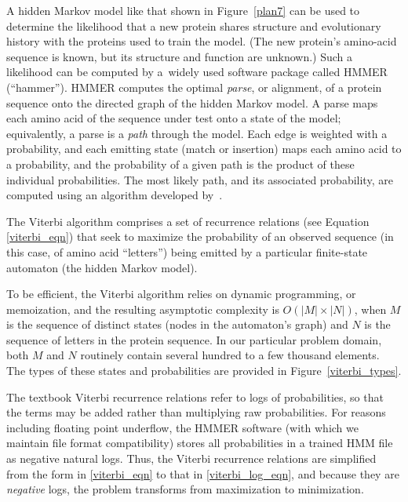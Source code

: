 \documentclass[preprint,nonatbib,blockstyle,nocopyrightspace,times]{sigplanconf}
\newcommand\figref[1]{Figure~\ref{#1}}
\begin{document}
A hidden Markov model like that shown in \figref{plan7} can be used to
determine the likelihood that a new protein shares structure and
evolutionary history with the proteins used to train the model.
(The new protein's amino-acid sequence is known, but its structure and
function are unknown.)
Such a likelihood can be computed by
a~widely used software package called HMMER (``hammer'').
HMMER computes the optimal \textit{parse}, or 
alignment, of a protein sequence onto the directed graph of the hidden Markov 
model.
A parse maps each amino acid of the sequence under test onto a state
of the model; equivalently, a parse is a \textit{path} through the model.
Each edge is weighted with a probability, and each emitting 
state (match or insertion) maps each amino acid to a probability,
and the 
probability of a given path is the product of these individual probabilities.
The most likely path, and its associated probability, are computed 
using an algorithm developed by~\citet{Viterbi:1967}.


The Viterbi algorithm comprises a set of recurrence 
relations (see Equation \ref{viterbi_eqn}) that seek to maximize the 
probability of an observed sequence (in this case, of amino acid ``letters'') 
being emitted by a particular finite-state automaton (the hidden Markov model).

To be efficient, the Viterbi 
algorithm relies on dynamic programming, or memoization, and the resulting 
asymptotic complexity is $O(|M|\times|N|)$, when $M$ is the sequence of 
distinct states (nodes in the automaton's graph) and $N$ is the sequence of 
letters in the protein sequence.
In our particular problem domain, both $M$ and 
$N$ routinely contain several hundred to a few thousand elements.
The types of 
these states and probabilities are provided in Figure~\ref{viterbi_types}.


\begin{figure}

\end{figure}


The textbook Viterbi recurrence relations refer to logs of probabilities, so 
that the terms may be added rather than multiplying raw probabilities.
For 
reasons including floating point underflow, the HMMER software (with which we 
maintain file format compatibility) stores all probabilities in a trained HMM 
file as negative natural logs.
Thus, the Viterbi recurrence relations are 
simplified from the form in \ref{viterbi_eqn} to that in \ref{viterbi_log_eqn}, 
and because they are \textit{negative} logs, the problem transforms from 
maximization to minimization.
\end{document}
